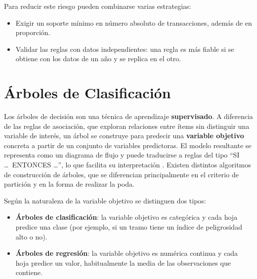 \documentclass[twoside,a4paper,12pt,onecolumn,openany]{book}
\begin{document}
\vspace{0.5cm}

Para reducir este riesgo pueden combinarse varias estrategias:

\begin{itemize}
    \item Exigir un soporte mínimo en número absoluto de transacciones, además de en proporción.

    \item Validar las reglas con datos independientes: una regla es más fiable si se obtiene con los datos de un año y se replica en el otro.
\end{itemize}
 
\section{Árboles de Clasificación}

Los árboles de decisión son una técnica de aprendizaje \textbf{supervisado}. A diferencia de las reglas de asociación, que exploran relaciones entre ítems sin distinguir una variable de interés, un árbol se construye para predecir una \textbf{variable objetivo} concreta a partir de un conjunto de variables predictoras. El modelo resultante se representa como un diagrama de flujo y puede traducirse a reglas del tipo ``SI \dots\ ENTONCES \dots'', lo que facilita su interpretación \cite{guion_arboles2024, tema3_clasificacion}. Existen distintos algoritmos de construcción de árboles, que se diferencian principalmente en el criterio de partición y en la forma de realizar la poda. \cite{quinlan1986, quinlan1993}

\vspace{0.5cm}
 
Según la naturaleza de la variable objetivo se distinguen dos tipos:

\begin{itemize}

    \item \textbf{Árboles de clasificación}: la variable objetivo es categórica y cada hoja predice una clase (por ejemplo, si un tramo tiene un índice de peligrosidad alto o no).
    
    \item \textbf{Árboles de regresión}: la variable objetivo es numérica continua y cada hoja predice un valor, habitualmente la media de las observaciones que contiene.
    
\end{itemize}
\end{document}
